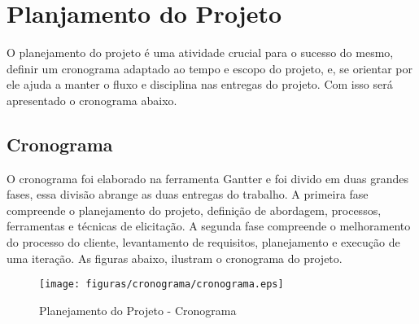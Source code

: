 \chapter[Planjamento do Projeto]{Planjamento do Projeto}\label{cap7}

O planejamento do projeto é uma atividade crucial para o sucesso do mesmo, definir
um cronograma adaptado ao tempo e escopo do projeto, e, se orientar por ele ajuda
a manter o fluxo e disciplina nas entregas do projeto. Com isso será apresentado o cronograma abaixo.

\section{Cronograma}

O cronograma foi elaborado na ferramenta Gantter e foi divido em duas grandes fases,
essa divisão abrange as duas entregas do trabalho. A primeira fase compreende o planejamento
do projeto, definição de abordagem, processos, ferramentas e técnicas de elicitação.
A segunda fase compreende o melhoramento do processo do cliente, levantamento de requisitos,
planejamento e execução de uma iteração. As figuras abaixo, ilustram o cronograma do projeto.

\begin{figure}[H]
    \centering
	\texttt{[image: figuras/cronograma/cronograma.eps]}
    \caption{Planejamento do Projeto - Cronograma}
    \label{fig:processo}
\end{figure}
